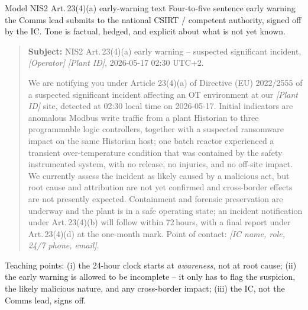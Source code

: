 \documentclass[11pt,a4paper]{article}
\begin{document}
\begin{solutionbox}{Model NIS2 Art.\,23(4)(a) early-warning text}
Four-to-five sentence early warning the Comms lead submits to the
national CSIRT / competent authority, signed off by the IC. Tone is
factual, hedged, and explicit about what is not yet known.
\begin{quote}\small
\textbf{Subject:} NIS2 Art.\,23(4)(a) early warning -- suspected
significant incident, \emph{[Operator]} \emph{[Plant ID]}, 2026-05-17
02:30 UTC+2.

We are notifying you under Article 23(4)(a) of Directive (EU)
2022/2555 of a suspected significant incident affecting an OT
environment at our \emph{[Plant ID]} site, detected at 02:30 local
time on 2026-05-17. Initial indicators are anomalous Modbus write
traffic from a plant Historian to three programmable logic
controllers, together with a suspected ransomware impact on the same
Historian host; one batch reactor experienced a transient
over-temperature condition that was contained by the safety
instrumented system, with no release, no injuries, and no off-site
impact. We currently assess the incident as likely caused by a
malicious act, but root cause and attribution are not yet confirmed
and cross-border effects are not presently expected. Containment and
forensic preservation are underway and the plant is in a safe
operating state; an incident notification under Art.\,23(4)(b) will
follow within 72\,hours, with a final report under Art.\,23(4)(d) at
the one-month mark. Point of contact: \emph{[IC name, role, 24/7
phone, email]}.
\end{quote}
Teaching points: (i) the 24-hour clock starts at \emph{awareness},
not at root cause; (ii) the early warning is allowed to be
incomplete -- it only has to flag the suspicion, the likely malicious
nature, and any cross-border impact; (iii) the IC, not the Comms
lead, signs off.
\end{solutionbox}
\end{document}

